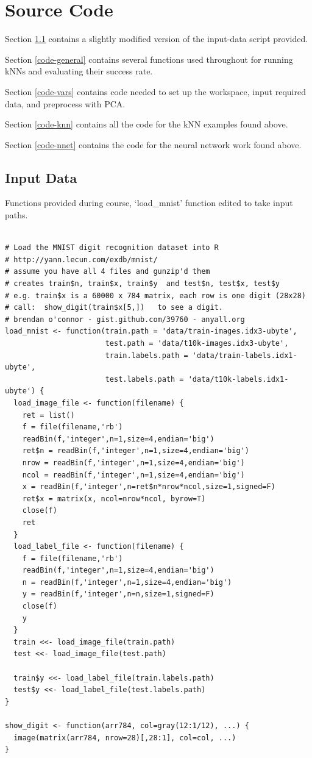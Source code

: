 \documentclass[11pt]{article} %
\begin{document}
\section{Source Code}

Section \ref{code-input} contains a slightly modified version of the input-data script provided. 

Section \ref{code-general} contains several functions used throughout for running kNNs and evaluating their success rate.

Section \ref{code-vars} contains code needed to set up the workspace, input required data, and preprocess with PCA.

Section \ref{code-knn} contains all the code for the kNN examples found above.

Section \ref{code-nnet} contains the code for the neural network work found above.

\subsection{Input Data}
\label{code-input}

Functions provided during course, `load\_mnist' function edited to take input paths. 
\begin{lstlisting}

# Load the MNIST digit recognition dataset into R
# http://yann.lecun.com/exdb/mnist/
# assume you have all 4 files and gunzip'd them
# creates train$n, train$x, train$y  and test$n, test$x, test$y
# e.g. train$x is a 60000 x 784 matrix, each row is one digit (28x28)
# call:  show_digit(train$x[5,])   to see a digit.
# brendan o'connor - gist.github.com/39760 - anyall.org
load_mnist <- function(train.path = 'data/train-images.idx3-ubyte',
                       test.path = 'data/t10k-images.idx3-ubyte',
                       train.labels.path = 'data/train-labels.idx1-ubyte',
                       test.labels.path = 'data/t10k-labels.idx1-ubyte') {
  load_image_file <- function(filename) {
    ret = list()
    f = file(filename,'rb')
    readBin(f,'integer',n=1,size=4,endian='big')
    ret$n = readBin(f,'integer',n=1,size=4,endian='big')
    nrow = readBin(f,'integer',n=1,size=4,endian='big')
    ncol = readBin(f,'integer',n=1,size=4,endian='big')
    x = readBin(f,'integer',n=ret$n*nrow*ncol,size=1,signed=F)
    ret$x = matrix(x, ncol=nrow*ncol, byrow=T)
    close(f)
    ret
  }
  load_label_file <- function(filename) {
    f = file(filename,'rb')
    readBin(f,'integer',n=1,size=4,endian='big')
    n = readBin(f,'integer',n=1,size=4,endian='big')
    y = readBin(f,'integer',n=n,size=1,signed=F)
    close(f)
    y
  }
  train <<- load_image_file(train.path)
  test <<- load_image_file(test.path)
  
  train$y <<- load_label_file(train.labels.path)
  test$y <<- load_label_file(test.labels.path)  
}

show_digit <- function(arr784, col=gray(12:1/12), ...) {
  image(matrix(arr784, nrow=28)[,28:1], col=col, ...)
}

\end{lstlisting}
\end{document}
